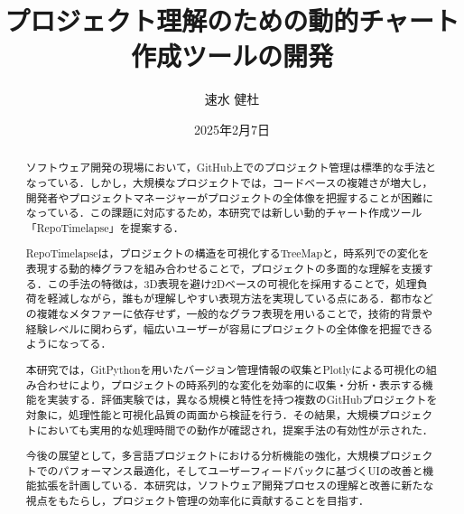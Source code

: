 \documentclass[12pt,twoside]{jbook}
\begin{document}
\title{
プロジェクト理解のための動的チャート作成ツールの開発
}


\author{%
  速水 健杜
}

\date{2025年2月7日}






\maketitle


\begin{abstract}
  ソフトウェア開発の現場において，GitHub上でのプロジェクト管理は標準的な手法となっている．しかし，大規模なプロジェクトでは，コードベースの複雑さが増大し，開発者やプロジェクトマネージャーがプロジェクトの全体像を把握することが困難になっている．この課題に対応するため，本研究では新しい動的チャート作成ツール「RepoTimelapse」を提案する．
  
  RepoTimelapseは，プロジェクトの構造を可視化するTreeMapと，時系列での変化を表現する動的棒グラフを組み合わせることで，プロジェクトの多面的な理解を支援する．この手法の特徴は，3D表現を避け2Dベースの可視化を採用することで，処理負荷を軽減しながら，誰もが理解しやすい表現方法を実現している点にある．都市などの複雑なメタファーに依存せず，一般的なグラフ表現を用いることで，技術的背景や経験レベルに関わらず，幅広いユーザーが容易にプロジェクトの全体像を把握できるようになってる．
  
  本研究では，GitPythonを用いたバージョン管理情報の収集とPlotlyによる可視化の組み合わせにより，プロジェクトの時系列的な変化を効率的に収集・分析・表示する機能を実装する．評価実験では，異なる規模と特性を持つ複数のGitHubプロジェクトを対象に，処理性能と可視化品質の両面から検証を行う．その結果，大規模プロジェクトにおいても実用的な処理時間での動作が確認され，提案手法の有効性が示された．

  今後の展望として，多言語プロジェクトにおける分析機能の強化，大規模プロジェクトでのパフォーマンス最適化，そしてユーザーフィードバックに基づくUIの改善と機能拡張を計画している．本研究は，ソフトウェア開発プロセスの理解と改善に新たな視点をもたらし，プロジェクト管理の効率化に貢献することを目指す．
\end{abstract}
\end{document}
